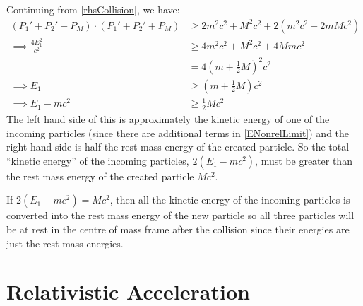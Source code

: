 \documentclass[../main.tex]{subfiles}
\begin{document}
Continuing from \cref{rhsCollision}, we have:
\begin{align*}
  (P_1' + P_2' + P_M) \cdot (P_1' + P_2' + P_M) &\geq 2m^2c^2 + M^2 c^2 + 2(m^2c^2 + 2mMc^2) \\
  \implies \frac{4E^2_1}{c^2} &\geq 4m^2c^2 + M^2 c^2 + 4Mmc^2 \\
                              &= 4\left(m + \frac{1}{2}M\right)^2c^2 \\
  \implies E_1 &\geq \left(m + \frac{1}{2}M\right)c^2 \\
  \implies E_1 - mc^2 &\geq \frac{1}{2}Mc^2
\end{align*}
The left hand side of this is approximately the kinetic energy of one of the incoming particles (since there are additional terms in \cref{ENonrelLimit}) and the right hand side is half the rest mass energy of the created particle.
So the total ``kinetic energy'' of the incoming particles, $2(E_1 - mc^2)$, must be greater than the rest mass energy of the created particle $Mc^2$.

\begin{remark}
  If $2(E_1 - mc^2) = Mc^2$, then all the kinetic energy of the incoming particles is converted into the rest mass energy of the new particle so all three particles will be at rest in the centre of mass frame after the collision since their energies are just the rest mass energies.
\end{remark}
\section{Relativistic Acceleration}
\end{document}
